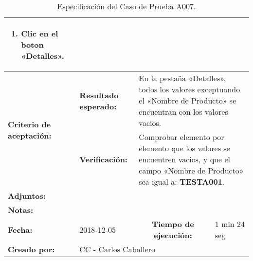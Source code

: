 \begin{table}[H]
\begin{tabular}{|p{2.5cm}|p{2.5cm}|p{2.8cm}|p{2.5cm}|p{2.6cm}|}
{{\begin{enumerate}
\item Clic en el boton «Detalles».
\end{enumerate}
}} \\
\hline
\multirow{2}{2.8cm}{\footnotesize{\textbf{Criterio de aceptación:}}} &
\footnotesize{\textbf{Resultado esperado:}} &
\multicolumn{3}{p{9.1cm}|}{\footnotesize{En la pestaña «Detalles», todos los
valores exceptuando el «Nombre de Producto» se encuentran con los valores
vacios.}} \\
\cline{2-5}
& \footnotesize{\textbf{Verificación:}} &
\multicolumn{3}{p{9.1cm}|}{\footnotesize{Comprobar elemento por elemento que los
valores se encuentren vacios, y que el campo «Nombre de Producto» sea igual a:
\textbf{TESTA001}.}} \\
\hline
\footnotesize{\textbf{Adjuntos:}} &
\multicolumn{4}{p{12.4cm}|}{\footnotesize{}} \\
\hline
\footnotesize{\textbf{Notas:}} &
\multicolumn{4}{p{12.4cm}|}{\footnotesize{}} \\
\hline
\footnotesize{\textbf{Fecha:}} & \footnotesize{2018-12-05} & \multicolumn{2}{c|}{\footnotesize{\textbf{Tiempo de ejecución:}}} & \footnotesize{1 min 24 seg} \\
\hline
\footnotesize{\textbf{Creado por:}} &
\multicolumn{4}{p{12.4cm}|}{\footnotesize{CC - Carlos Caballero}} \\
\hline
\end{tabular}
\caption{Especificación del Caso de Prueba A007.}
\label{lltc}
\end{table}

